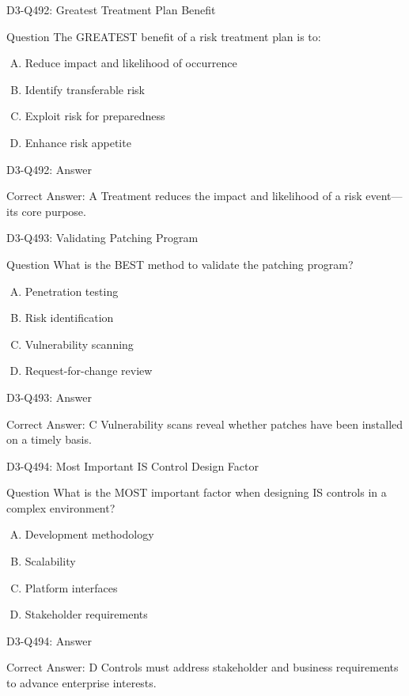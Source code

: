 \documentclass{beamer}
\begin{document}
\begin{frame}{D3-Q492: Greatest Treatment Plan Benefit}
	\begin{block}{Question}
		The GREATEST benefit of a risk treatment plan is to:
	\end{block}
	\begin{enumerate}[(A)]
		\item Reduce impact and likelihood of occurrence
		\item Identify transferable risk
		\item Exploit risk for preparedness
		\item Enhance risk appetite
	\end{enumerate}
\end{frame}
\begin{frame}{D3-Q492: Answer}
	\begin{block}{Correct Answer: A}
		Treatment reduces the impact and likelihood of a risk event—its core purpose.
	\end{block}
\end{frame}

\begin{frame}{D3-Q493: Validating Patching Program}
	\begin{block}{Question}
		What is the BEST method to validate the patching program?
	\end{block}
	\begin{enumerate}[(A)]
		\item Penetration testing
		\item Risk identification
		\item Vulnerability scanning
		\item Request-for-change review
	\end{enumerate}
\end{frame}
\begin{frame}{D3-Q493: Answer}
	\begin{block}{Correct Answer: C}
		Vulnerability scans reveal whether patches have been installed on a timely basis.
	\end{block}
\end{frame}

\begin{frame}{D3-Q494: Most Important IS Control Design Factor}
	\begin{block}{Question}
		What is the MOST important factor when designing IS controls in a complex environment?
	\end{block}
	\begin{enumerate}[(A)]
		\item Development methodology
		\item Scalability
		\item Platform interfaces
		\item Stakeholder requirements
	\end{enumerate}
\end{frame}
\begin{frame}{D3-Q494: Answer}
	\begin{block}{Correct Answer: D}
		Controls must address stakeholder and business requirements to advance enterprise interests.
	\end{block}
\end{frame}
\end{document}
